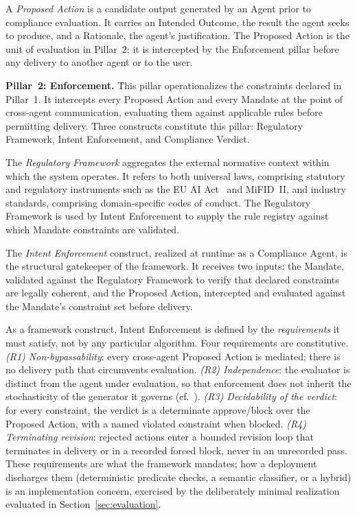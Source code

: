 \documentclass[runningheads]{llncs}
\begin{document}
A \textit{Proposed Action} is a candidate output generated by an Agent
prior to compliance evaluation. It carries an Intended Outcome, the
result the agent seeks to produce, and a Rationale, the agent's
justification. The Proposed Action is the unit of evaluation in
Pillar~2: it is intercepted by the Enforcement pillar before any
delivery to another agent or to the user.

\textbf{Pillar~2: Enforcement.}
This pillar operationalizes the constraints declared in Pillar~1. It
intercepts every Proposed Action and every Mandate at the point of
cross-agent communication, evaluating them against applicable rules
before permitting delivery. Three constructs constitute this pillar:
Regulatory Framework, Intent Enforcement, and Compliance Verdict.

The \textit{Regulatory Framework} aggregates the external normative
context within which the system operates. It refers to both universal
laws, comprising statutory and regulatory instruments such as the EU AI
Act~\cite{euaiact2024} and MiFID~II, and industry standards, comprising
domain-specific codes of conduct. The Regulatory Framework is used by
Intent Enforcement to supply the rule registry against which Mandate
constraints are validated.

The \textit{Intent Enforcement} construct, realized at runtime as a
Compliance Agent, is the structural gatekeeper of the framework. It
receives two inputs: the Mandate, validated against the Regulatory
Framework to verify that declared constraints are legally coherent, and
the Proposed Action, intercepted and evaluated against the Mandate's
constraint set before delivery.

As a framework construct, Intent Enforcement is defined by the
\emph{requirements} it must satisfy, not by any particular algorithm.
Four requirements are constitutive. \textit{(R1) Non-bypassability}:
every cross-agent Proposed Action is mediated; there is no delivery path
that circumvents evaluation. \textit{(R2) Independence}: the evaluator is
distinct from the agent under evaluation, so that enforcement does not
inherit the stochasticity of the generator it governs
(cf.~\cite{huang2023selfcorrect}). \textit{(R3) Decidability of the
verdict}: for every constraint, the verdict is a determinate
approve/block over the Proposed Action, with a named violated constraint
when blocked. \textit{(R4) Terminating revision}: rejected actions enter
a bounded revision loop that terminates in delivery or in a recorded
forced block, never in an unrecorded pass. These requirements are what
the framework mandates; how a deployment discharges them (deterministic
predicate checks, a semantic classifier, or a hybrid) is an
implementation concern, exercised by the deliberately minimal realization
evaluated in Section~\ref{sec:evaluation}.
\end{document}
